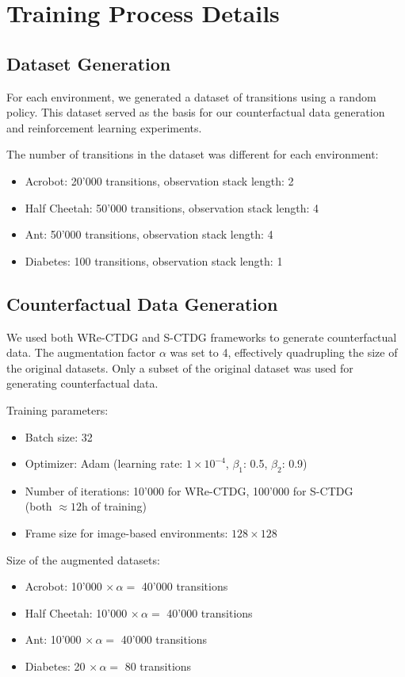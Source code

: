 \section{Training Process Details}

\subsection{Dataset Generation}

For each environment, we generated a dataset of transitions using a random policy.
This dataset served as the basis for our counterfactual
data generation and reinforcement learning experiments.

The number of transitions in the dataset was different for each environment:
\begin{itemize}
    \item Acrobot: 20'000 transitions, observation stack length: 2
    \item Half Cheetah: 50'000 transitions, observation stack length: 4
    \item Ant: 50'000 transitions, observation stack length: 4
    \item Diabetes: 100 transitions, observation stack length: 1
\end{itemize} 

\subsection{Counterfactual Data Generation}

We used both WRe-CTDG and S-CTDG frameworks to generate counterfactual data.
The augmentation factor $\alpha$ was set to 4, effectively quadrupling
the size of the original datasets.
Only a subset of the original dataset
was used for generating counterfactual data.

Training parameters:
\begin{itemize}
    \item Batch size: 32
    \item Optimizer: Adam (learning rate: $1\times 10^{-4}$, $\beta_1$: 0.5, $\beta_2$: 0.9)
    \item Number of iterations: 10'000 for WRe-CTDG, 100'000 for S-CTDG\\
    (both $\approx 12$h of training)
    \item Frame size for image-based environments: $128\times 128$
\end{itemize}
Size of the augmented datasets:
\begin{itemize}
    \item Acrobot: 10'000 $\times \, \alpha =$ 40'000 transitions 
    \item Half Cheetah: 10'000 $\times \, \alpha =$ 40'000 transitions
    \item Ant: 10'000 $\times \, \alpha =$ 40'000 transitions
    \item Diabetes: 20 $\times \, \alpha =$ 80 transitions
\end{itemize}



